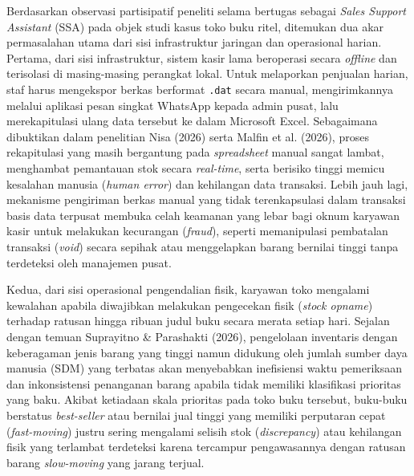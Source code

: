\documentclass[11pt, a4paper]{article}
\begin{document}
Berdasarkan observasi partisipatif peneliti selama bertugas sebagai \textit{Sales Support Assistant} (SSA) pada objek studi kasus toko buku ritel, ditemukan dua akar permasalahan utama dari sisi infrastruktur jaringan dan operasional harian. Pertama, dari sisi infrastruktur, sistem kasir lama beroperasi secara \textit{offline} dan terisolasi di masing-masing perangkat lokal. Untuk melaporkan penjualan harian, staf harus mengekspor berkas berformat \texttt{.dat} secara manual, mengirimkannya melalui aplikasi pesan singkat WhatsApp kepada admin pusat, lalu merekapitulasi ulang data tersebut ke dalam Microsoft Excel. Sebagaimana dibuktikan dalam penelitian Nisa (2026) serta Malfin et al. (2026), proses rekapitulasi yang masih bergantung pada \textit{spreadsheet} manual sangat lambat, menghambat pemantauan stok secara \textit{real-time}, serta berisiko tinggi memicu kesalahan manusia (\textit{human error}) dan kehilangan data transaksi. Lebih jauh lagi, mekanisme pengiriman berkas manual yang tidak terenkapsulasi dalam transaksi basis data terpusat membuka celah keamanan yang lebar bagi oknum karyawan kasir untuk melakukan kecurangan (\textit{fraud}), seperti memanipulasi pembatalan transaksi (\textit{void}) secara sepihak atau menggelapkan barang bernilai tinggi tanpa terdeteksi oleh manajemen pusat.

Kedua, dari sisi operasional pengendalian fisik, karyawan toko mengalami kewalahan apabila diwajibkan melakukan pengecekan fisik (\textit{stock opname}) terhadap ratusan hingga ribuan judul buku secara merata setiap hari. Sejalan dengan temuan Suprayitno \& Parashakti (2026), pengelolaan inventaris dengan keberagaman jenis barang yang tinggi namun didukung oleh jumlah sumber daya manusia (SDM) yang terbatas akan menyebabkan inefisiensi waktu pemeriksaan dan inkonsistensi penanganan barang apabila tidak memiliki klasifikasi prioritas yang baku. Akibat ketiadaan skala prioritas pada toko buku tersebut, buku-buku berstatus \textit{best-seller} atau bernilai jual tinggi yang memiliki perputaran cepat (\textit{fast-moving}) justru sering mengalami selisih stok (\textit{discrepancy}) atau kehilangan fisik yang terlambat terdeteksi karena tercampur pengawasannya dengan ratusan barang \textit{slow-moving} yang jarang terjual.
\end{document}
